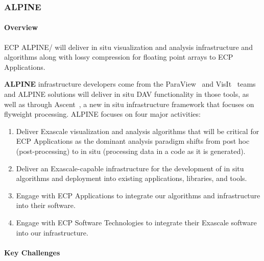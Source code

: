 
\subsubsection{ ALPINE} 


\paragraph{Overview} 

ECP ALPINE/{\zfp} will deliver in situ visualization and analysis infrastructure and algorithms along with lossy compression for floating point arrays to ECP Applications.  

\textbf{ALPINE} infrastructure developers come from the ParaView~\cite{alpine:Paraview1,alpine:Paraview2} and VisIt~\cite{alpine:VisIt} teams and ALPINE solutions will deliver in situ DAV functionality in those tools, as well as through Ascent~\cite{alpine:Ascent}, a new in situ infrastructure framework that focuses on flyweight processing. 
%
ALPINE  focuses on four major activities: 
\begin{enumerate}
        \setlength{\itemsep}{1pt}
        \setlength{\parskip}{0pt}
        \setlength{\parsep}{0pt}
\item Deliver Exascale visualization and analysis algorithms that will be critical for ECP Applications as the dominant analysis paradigm shifts from post hoc (post-processing) to in situ (processing data in a code as it is generated). 
\item Deliver an Exascale-capable infrastructure for the development of in situ algorithms and deployment into existing applications, libraries, and tools. 
\item Engage with ECP Applications to integrate our algorithms and infrastructure into their software. 
\item Engage with ECP Software Technologies to integrate their Exascale software into our infrastructure. 
\end{enumerate}


\paragraph{Key  Challenges}

